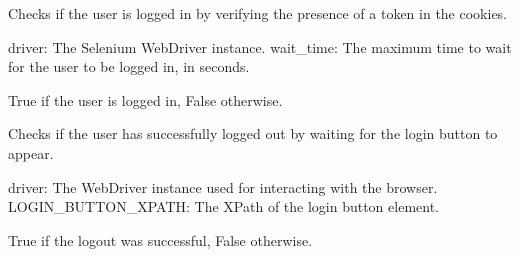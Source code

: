 \documentclass[letterpaper,10pt,english]{sphinxmanual}
\begin{document}
\begin{fulllineitems}
\label{\detokenize{utils:utils.authentication_management.check_if_loggedIn}}
\pysigstartsignatures
{}
\pysigstopsignatures
\sphinxAtStartPar
Checks if the user is logged in by verifying the presence of a token in the cookies.
\begin{description}
\sphinxAtStartPar
driver: The Selenium WebDriver instance.
wait\_time: The maximum time to wait for the user to be logged in, in seconds.

\sphinxAtStartPar
True if the user is logged in, False otherwise.

\end{description}

\end{fulllineitems}


\begin{fulllineitems}
\label{\detokenize{utils:utils.authentication_management.check_logout}}
\pysigstartsignatures
{}
\pysigstopsignatures
\sphinxAtStartPar
Checks if the user has successfully logged out by waiting for the login button to appear.
\begin{description}
\sphinxAtStartPar
driver: The WebDriver instance used for interacting with the browser.
LOGIN\_BUTTON\_XPATH: The XPath of the login button element.

\sphinxAtStartPar
True if the logout was successful, False otherwise.

\end{description}

\end{fulllineitems}
\end{document}
